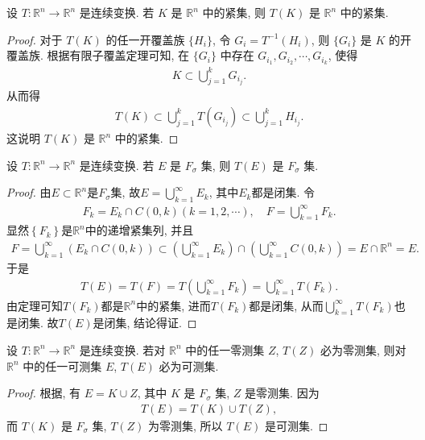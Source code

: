\documentclass[../../main.tex]{subfiles}
\begin{document}
\begin{theorem}
设 $T:\mathbb{R}^n\to\mathbb{R}^n$ 是连续变换. 若 $K$ 是 $\mathbb{R}^n$ 中的紧集, 则 $T(K)$ 是 $\mathbb{R}^n$ 中的紧集.
\end{theorem}
\begin{proof}
对于 $T(K)$ 的任一开覆盖族 $\{H_i\}$, 令 $G_i = T^{-1}(H_i)$, 则 $\{G_i\}$ 是 $K$ 的开覆盖族. 根据有限子覆盖定理可知, 在 $\{G_i\}$ 中存在 $G_{i_1},G_{i_2},\cdots,G_{i_k}$, 使得
\begin{align*}
K\subset\bigcup_{j = 1}^{k}G_{i_j}.
\end{align*}
从而得
\begin{align*}
T(K)\subset\bigcup_{j = 1}^{k}T(G_{i_j})\subset\bigcup_{j = 1}^{k}H_{i_j}.
\end{align*}
这说明 $T(K)$ 是 $\mathbb{R}^n$ 中的紧集.

\end{proof}

\begin{corollary}
设 $T:\mathbb{R}^n\to\mathbb{R}^n$ 是连续变换. 若 $E$ 是 $F_\sigma$ 集, 则 $T(E)$ 是 $F_\sigma$ 集.
\end{corollary}
\begin{proof}
由$E\subset \mathbb{R} ^n$是$F_{\sigma}$集, 故$E=\bigcup_{k=1}^{\infty}{E_k}$, 其中$E_k$都是闭集. 令
\begin{align*}
F_k=E_k\cap C\left( 0,k \right) \left( k=1,2,\cdots \right) ,\quad F=\bigcup_{k=1}^{\infty}{F_k}.
\end{align*}
显然$\left\{ F_k \right\}$是$\mathbb{R} ^n$中的递增紧集列, 并且
\begin{align*}
F=\bigcup_{k=1}^{\infty}{\left( E_k\cap C\left( 0,k \right) \right)}\subset \left( \bigcup_{k=1}^{\infty}{E_k} \right) \cap \left( \bigcup_{k=1}^{\infty}{C\left( 0,k \right)} \right) =E\cap \mathbb{R} ^n=E.
\end{align*}
于是
\begin{align*}
T\left( E \right) =T\left( F \right) =T\left( \bigcup_{k=1}^{\infty}{F_k} \right) =\bigcup_{k=1}^{\infty}{T\left( F_k \right)}.
\end{align*}
由定理可知$T\left( F_k \right)$都是$\mathbb{R} ^n$中的紧集, 进而$T\left( F_k \right)$都是闭集, 从而$\bigcup_{k=1}^{\infty}{T\left( F_k \right)}$也是闭集. 故$T\left( E \right)$是闭集, 结论得证.

\end{proof}

\begin{corollary}
设 $T:\mathbb{R}^n\to\mathbb{R}^n$ 是连续变换. 若对 $\mathbb{R}^n$ 中的任一零测集 $Z$, $T(Z)$ 必为零测集, 则对 $\mathbb{R}^n$ 中的任一可测集 $E$, $T(E)$ 必为可测集.
\end{corollary}
\begin{proof}
根据, 有 $E = K\cup Z$, 其中 $K$ 是 $F_\sigma$ 集, $Z$ 是零测集. 因为
\begin{align*}
T(E) = T(K)\cup T(Z),
\end{align*}
而 $T(K)$ 是 $F_\sigma$ 集, $T(Z)$ 为零测集, 所以 $T(E)$ 是可测集.

\end{proof}
\end{document}
